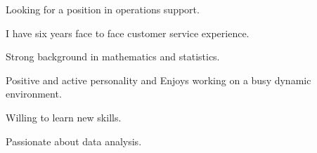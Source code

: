 

\begin{cventries}

  \cventry
    {} %
    {} %
    {} %
    {} %
    {
      \begin{cvitems} %
      \item Looking for a position in operations support.
      \item I have six years face to face customer service experience.
      \item Strong background in mathematics and statistics.
      \item Positive and active personality and Enjoys working on a busy dynamic environment.
      \item Willing to learn new skills.
      \item Passionate about data analysis. 
      \end{cvitems}
    }


\end{cventries}
